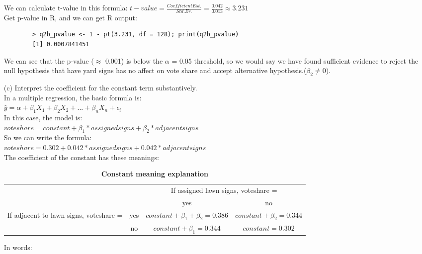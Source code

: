 \documentclass[12pt,letterpaper]{article}
\begin{document}
\begin{enumerate}
	We can calculate t-value in this formula: $t-value = \frac{Coefficient Est.}{Std. Er.} = \frac{0.042}{0.013} \approx 3.231$\\
	Get p-value in R, and we can get R output: 
	\begin{verbatim}
		> q2b_pvalue <- 1 - pt(3.231, df = 128); print(q2b_pvalue)
		[1] 0.0007841451
	\end{verbatim} 
	
	We can see that the p-value ($\approx$ 0.001) is below the $\alpha$ = 0.05 threshold, so we would say we have found sufficient evidence to reject the null hypothesis that have yard signs has no affect on vote share and accept alternative hypothesis.($\beta_2 \neq 0$).
	
	\newpage
	
	\item [(c)] Interpret the coefficient for the constant term substantively.\\
	
	In a multiple regression, the basic formula is:\\
	$\hat{y} = \alpha + \beta_1 X_1 + \beta_2 X_2 + ... + \beta_n X_n + \epsilon_i$\\
	In this case, the model is:\\
	$voteshare = constant + \beta_1 * assigned signs + \beta_2 * adjacent signs$\\
	So we can write the formula: \\
	$voteshare = 0.302 + 0.042 * assigned signs + 0.042 * adjacent signs$\\
	
	The coefficient of the constant has these meanings:
	\begin{table}[h]
		\centering
		\caption{\textbf{Constant meaning explanation}}
		\vspace{.2cm}
		\begin{tabular}{cc|cc}
			\multicolumn{2}{c}{} & \multicolumn{2}{c}{If assigned lawn signs, voteshare = } \\
			\multicolumn{2}{c}{} & yes & no \\
			\hline
			\multirow{2}{*}{If adjacent to lawn signs, voteshare = } & yes & $constant + \beta_1 + \beta_2  = 0.386 $ & $constant + \beta_2 = 0.344 $ \\
			& no & $constant + \beta_1 = 0.344 $ & $constant = 0.302 $ \\
		\end{tabular}
	\end{table}
	
	In words:
	

\end{enumerate}
\end{document}
